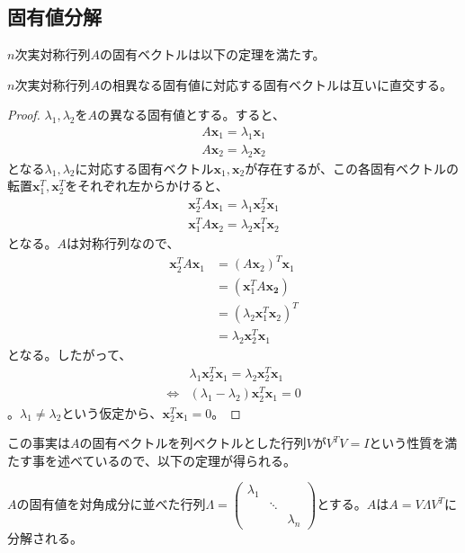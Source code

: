 \subsection{固有値分解}
$n$次実対称行列$A$の固有ベクトルは以下の定理を満たす。
\begin{theorem}
  $n$次実対称行列$A$の相異なる固有値に対応する固有ベクトルは互いに直交する。
\end{theorem}
\begin{proof}
  $\lambda_1,\lambda_2$を$A$の異なる固有値とする。すると、
  \begin{align*}
    A \mathbf{x}_1 = \lambda_1 \mathbf{x}_1 \\
    A \mathbf{x}_2 = \lambda_2 \mathbf{x}_2
  \end{align*}
  となる$\lambda_1, \lambda_2$に対応する固有ベクトル$\mathbf{x}_1, \mathbf{x}_2$が存在するが、この各固有ベクトルの転置$\mathbf{x}_1^T, \mathbf{x}_2^T$をそれぞれ左からかけると、
  \begin{align*}
    \mathbf{x}_2^T A \mathbf{x}_1 = \lambda_1 \mathbf{x}_2^T \mathbf{x}_1 \\
    \mathbf{x}_1^T A \mathbf{x}_2 = \lambda_2 \mathbf{x}_1^T \mathbf{x}_2
  \end{align*}
  となる。$A$は対称行列なので、
  \begin{align*}
    \mathbf{x}_2^T A \mathbf{x}_1 & = \left(A \mathbf{x}_2\right)^T \mathbf{x}_1 \\
                                  & = \left(\mathbf{x}_1^T A \mathbf{x_2}\right) \\
                                  & = \left(\lambda_2 \mathbf{x}_1^T \mathbf{x}_2\right)^T \\
                                  & = \lambda_2 \mathbf{x}_2^T \mathbf{x}_1
  \end{align*}
  となる。したがって、
  \begin{align*}
                    & \lambda_1 \mathbf{x}_2^T \mathbf{x}_1 = \lambda_2 \mathbf{x}_2^T \mathbf{x}_1 \\
    \Leftrightarrow & \left(\lambda_1 - \lambda_2\right) \mathbf{x}_2^T \mathbf{x}_1 = 0
  \end{align*}
  。$\lambda_1 \not= \lambda_2$という仮定から、$\mathbf{x}_2^T \mathbf{x}_1 = 0$。
\end{proof}
この事実は$A$の固有ベクトルを列ベクトルとした行列$V$が$V^T V = I$という性質を満たす事を述べているので、以下の定理が得られる。
\begin{theorem}
  $A$の固有値を対角成分に並べた行列$\Lambda = \displaystyle{\left(\begin{array}{ccc} \lambda_1 & & \\ & \ddots & \\ & & \lambda_n \end{array}\right)}$とする。$A$は$A = V \Lambda V^T$に分解される。
\end{theorem}
